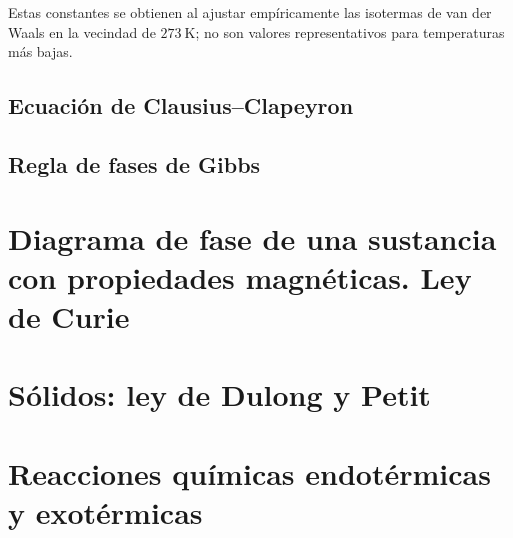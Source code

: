 Estas constantes se obtienen al ajustar empíricamente las isotermas de van der Waals en la vecindad de
$273\ \mathrm{K}$; no son valores representativos para temperaturas más bajas.

\subsection{Ecuación de Clausius--Clapeyron}


\subsection{Regla de fases de Gibbs}


\section{Diagrama de fase de una sustancia con propiedades magnéticas. Ley de Curie}


\section{Sólidos: ley de Dulong y Petit}


\section{Reacciones químicas endotérmicas y exotérmicas}


